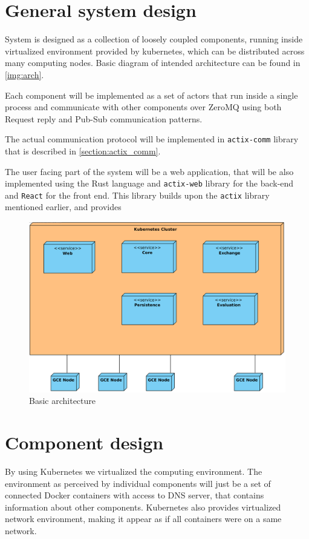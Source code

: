 \section{General system design}
System is designed as a collection of loosely coupled components, running inside virtualized environment provided by kubernetes, which
can be distributed across many computing nodes. Basic diagram of intended architecture can be found in \autoref{img:arch}.

Each component will be implemented as a set of actors that run inside a single process and communicate with other components
over ZeroMQ using both Request reply and Pub-Sub communication patterns.

The actual communication protocol will be implemented in \verb|actix-comm| library that is described in \autoref{section:actix_comm}.

The user facing part of the system will be a web application, that will be also implemented using the Rust language and
\verb|actix-web| library for the back-end and \verb|React| for the front end. This library builds upon the \verb|actix| library mentioned earlier, and provides


\begin{figure}[H]
    \includegraphics[width=\textwidth]{obrazky-figures/Deployment Diagram1.png}
    \caption{Basic architecture}
    \label{img:arch}
\end{figure}


\section{Component design}
By using Kubernetes we virtualized the computing environment. The environment as perceived by individual components
will just be a set of connected Docker containers with access to DNS server, that contains information about other components.
Kubernetes also provides virtualized network environment, making it appear as if all containers were on a same network.

